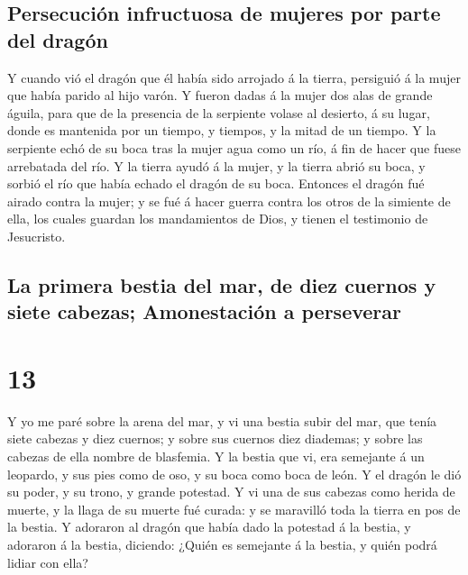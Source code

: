 \hypertarget{persecuciuxf3n-infructuosa-de-mujeres-por-parte-del-draguxf3n}{%
\subsection{Persecución infructuosa de mujeres por parte del
dragón}\label{persecuciuxf3n-infructuosa-de-mujeres-por-parte-del-draguxf3n}}

 Y cuando vió el dragón que él había sido arrojado á la
tierra, persiguió á la mujer que había parido al hijo varón.
 Y fueron dadas á la mujer dos alas de grande águila, para
que de la presencia de la serpiente volase al desierto, á su lugar,
donde es mantenida por un tiempo, y tiempos, y la mitad de un tiempo.
 Y la serpiente echó de su boca tras la mujer agua como un
río, á fin de hacer que fuese arrebatada del río.  Y la
tierra ayudó á la mujer, y la tierra abrió su boca, y sorbió el río que
había echado el dragón de su boca.  Entonces el dragón fué
airado contra la mujer; y se fué á hacer guerra contra los otros de la
simiente de ella, los cuales guardan los mandamientos de Dios, y tienen
el testimonio de Jesucristo.

\hypertarget{la-primera-bestia-del-mar-de-diez-cuernos-y-siete-cabezas-amonestaciuxf3n-a-perseverar}{%
\subsection{La primera bestia del mar, de diez cuernos y siete cabezas;
Amonestación a
perseverar}\label{la-primera-bestia-del-mar-de-diez-cuernos-y-siete-cabezas-amonestaciuxf3n-a-perseverar}}

\hypertarget{section-12}{%
\section{13}\label{section-12}}

 Y yo me paré sobre la arena del mar, y vi una bestia subir
del mar, que tenía siete cabezas y diez cuernos; y sobre sus cuernos
diez diademas; y sobre las cabezas de ella nombre de blasfemia.
 Y la bestia que vi, era semejante á un leopardo, y sus pies
como de oso, y su boca como boca de león. Y el dragón le dió su poder, y
su trono, y grande potestad.  Y vi una de sus cabezas como
herida de muerte, y la llaga de su muerte fué curada: y se maravilló
toda la tierra en pos de la bestia.  Y adoraron al dragón
que había dado la potestad á la bestia, y adoraron á la bestia,
diciendo: ¿Quién es semejante á la bestia, y quién podrá lidiar con
ella?

